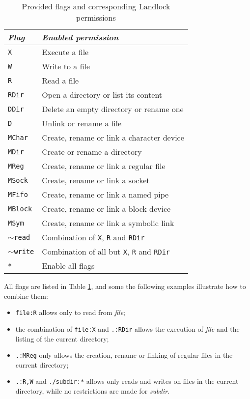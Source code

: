 \begin{table}
  \centering
  \begin{tabular}{|l|l|}
    \hline
    \textit{Flag} & \textit{Enabled permission} \\ \hline\hline
    \texttt{X} & Execute a file \\ \hline
    \texttt{W} & Write to a file \\ \hline
    \texttt{R} & Read a file \\ \hline
    \texttt{RDir} & Open a directory or list its content \\ \hline
    \texttt{DDir} & Delete an empty directory or rename one \\ \hline
    \texttt{D} & Unlink or rename a file \\ \hline
    \texttt{MChar} & Create, rename or link a character device \\ \hline
    \texttt{MDir} & Create or rename a directory \\ \hline
    \texttt{MReg} & Create, rename or link a regular file \\ \hline
    \texttt{MSock} & Create, rename or link a socket \\ \hline
    \texttt{MFifo} & Create, rename or link a named pipe \\ \hline
    \texttt{MBlock} & Create, rename or link a block device \\ \hline
    \texttt{MSym} & Create, rename or link a symbolic link \\ \hline
    \texttt{$\sim$read} & Combination of \texttt{X}, \texttt{R} and \texttt{RDir} \\ \hline
    \texttt{$\sim$write} & Combination of all but \texttt{X}, \texttt{R} and \texttt{RDir} \\ \hline
    \texttt{*} & Enable all flags \\ \hline
  \end{tabular}
  \caption{Provided flags and corresponding Landlock permissions}
  \label{table:landlock-flags}
\end{table}

All flags are listed in Table \ref{table:landlock-flags}, and some the following examples illustrate how to combine them:
\begin{itemize}
  \item \texttt{file:R} allows only to read from \textit{file};
  \item the combination of \texttt{file:X} and \texttt{.:RDir} allows the execution of \textit{file} and the listing of the current directory;
  \item \texttt{.:MReg} only allows the creation, rename or linking of regular files in the current directory;
  \item \texttt{.:R,W} and \texttt{./subdir:*} allows only reads and writes on files in the current directory, while no restrictions are
        made for \textit{subdir}.
\end{itemize}

